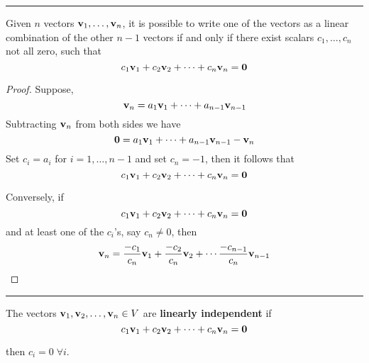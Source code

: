 \rule[0.01in]{\textwidth}{0.0025in}


















\begin{theorem}
Given $n$ vectors ${\bf v}_1, \dots, {\bf v}_n$, it is possible to write one of the vectors as a linear combination of the other $n-1$ vectors if and only if there exist scalars $c_1, \dots, c_n$ not all zero, such that 
\[  c_1 {\bf v}_1 + c_2 {\bf v}_2 + \cdots + c_n {\bf v}_n = {\bf 0} \]


\begin{proof}
	Suppose, 
\[ {\bf v}_n = a_1 {\bf v}_1 + \cdots + a_{n-1}{\bf v}_{n-1} \]
Subtracting ${\bf v}_n$ from both sides we have
\[  {\bf 0} = a_1 {\bf v}_1 + \cdots + a_{n-1}{\bf v}_{n-1} -  {\bf v}_n \] 
Set $c_i = a_i$ for $i=1, \dots, n-1$ and set $c_n = -1$, then it follows that 
\[  c_1 {\bf v}_1 + c_2 {\bf v}_2 + \cdots + c_n {\bf v}_n = {\bf 0} \]

Conversely, if 
\[  c_1 {\bf v}_1 + c_2 {\bf v}_2 + \cdots + c_n {\bf v}_n = {\bf 0} \]
and at least one of the $c_i$'s, say $c_n \ne 0$, then
\[  {\bf v}_n =  \frac{-c_1}{c_n} {\bf v}_1 +  \frac{-c_2}{c_n}  {\bf v}_2 + \cdots   \frac{-c_{n-1}}{c_n} {\bf v}_{n-1}  \]


\end{proof}
\end{theorem}



	 
	
 	
 \rule[0.01in]{\textwidth}{0.0025in}







\begin{tcolorbox}[colback=yellow!10!,colframe=gray!15!]
	\begin{definition}
		The vectors ${\bf v}_1, {\bf v}_2,  \dots, {\bf v}_n \in V$ are \textbf{linearly independent} if 
\[  c_1 {\bf v}_1 + c_2 {\bf v}_2 + \cdots + c_n {\bf v}_n = {\bf 0} \]

then $c_i = 0 \; \forall i$.


	\end{definition}
	 
\end{tcolorbox}




















